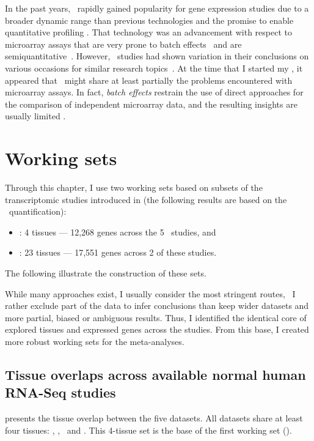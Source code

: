 In the past years,
\Rnaseq\ rapidly gained popularity
for gene expression studies
due to a broader dynamic range than previous technologies
and the promise to enable quantitative profiling .
That technology was an advancement with respect to microarray assays
that are very prone to batch effects~
and are semiquantitative~.
However, \Rnaseq\ studies had shown variation in their conclusions on various
occasions for similar research topics~.
At the time that I started my \phd,
it appeared that
\Rnaseq\ might share at least partially the problems encountered
with microarray assays.
In fact, \emph{batch effects} restrain the use of direct approaches
for the comparison of independent microarray data,
and the resulting insights are usually limited .
\vspace{-1mm}

\section{Working sets}
\vspace{-2mm}
Through this chapter, I use two working sets
based on subsets of the transcriptomic studies introduced in 
(the following results are based on the \htseq\ quantification):
\begin{itemize}[topsep=0pt,nosep]
    \item \setOne: 4 tissues --- 12,268 genes across the 5 \Rnaseq\ studies, and
    \item \setTwo: 23 tissues --- 17,551 genes across 2 of these studies.
\end{itemize}

The following 
illustrate the construction of these sets.

While many approaches exist,
I usually consider the most stringent routes,
\ie\ I rather exclude part of the data to infer conclusions than
keep wider datasets and more partial, biased or ambiguous results.
Thus, I identified the identical core of
explored tissues and expressed genes across the studies.
From this base, I created more robust working sets for the meta-analyses.

\subsection{Tissue overlaps across available normal human RNA-Seq studies \quad}%
\label{subsec:transtissueOverlap}
\vspace{-7mm}
 presents the tissue overlap between the five datasets.
All datasets share at least four tissues:
\heart, \kidney, \liver\ and \testis.
This 4-tissue set is the base of the first working set (\setOne).

